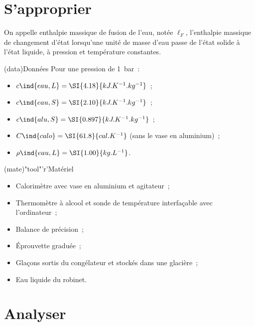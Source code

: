 \documentclass[../main/main.tex]{subfiles}
\begin{document}
{	\section{S'approprier}
	On appelle enthalpie massique de fusion de l'eau, notée $\ell_F$, l'enthalpie
	massique de changement d'état lorsqu'une unité de masse d'eau passe de l'état
	solide à l'état liquide, à pression et température constantes.
	\begin{tcbraster}[raster equal height=rows, raster columns=2]
		\begin{tcn}(data){Données}
			Pour une pression de \SI{1}{bar}~:
			\begin{itemize}
				\item $c\ind{eau,L} = \SI{4.18}{kJ.K^{-1}.kg^{-1}}$~;
				\item $c\ind{eau,S} = \SI{2.10}{kJ.K^{-1}.kg^{-1}}$~;
				\item $c\ind{alu,S} = \SI{0.897}{kJ.K^{-1}.kg^{-1}}$~;
				\item $C\ind{calo} = \SI{61.8}{cal.K^{-1}}$ (sans le vase en aluminium)~;
				\item $\rho\ind{eau,L} = \SI{1.00}{kg.L^{-1}}$.
			\end{itemize}
		\end{tcn}
		\begin{tcn}(mate)"tool"'r'{Matériel}
			\begin{itemize}
				\item Calorimètre avec vase en aluminium et agitateur~;
				\item Thermomètre à alcool et sonde de température interfaçable avec
				      l'ordinateur~;
				\item Balance de précision~;
				\item Éprouvette graduée~;
				\item Glaçons sortis du congélateur et stockés dans une glacière~;
				\item Eau liquide du robinet.
			\end{itemize}
		\end{tcn}
	\end{tcbraster}
}%
\setcounter{section}{1}
\section{Analyser}

%
\end{document}
